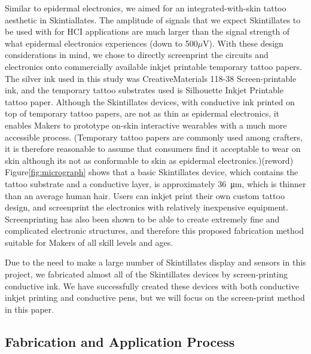 \documentclass{sigchi}
\begin{document}
Similar to epidermal electronics, we aimed for an integrated-with-skin tattoo aesthetic in Skintiallates. The amplitude of signals that we expect Skintillates to be used with for HCI applications are much larger than the signal strength of what epidermal electronics experiences (down to 500$\mu$V)\cite{Holleis:2008wn}. 
With these design considerations in mind, we chose to directly screenprint the circuits and electronics onto commercially available inkjet printable temporary tattoo papers. The silver ink used in this study was CreativeMaterials 118-38 Screen-printable ink, and the temporary tattoo substrates used is Silhouette Inkjet Printable tattoo paper. Although the  Skintillates devices, with conductive ink printed on top of temporary tattoo papers, are not as thin as epidermal electronics, it enables Makers to prototype on-skin interactive wearables with a much more accessible process. (Temporary tattoo papers are commonly used among crafters, it is therefore reasonable to assume that consumers find it acceptable to wear on skin although its not as conformable to skin as epidermal electronics.)(reword) Figure\ref{fig:micrograph} shows that a basic Skintillates device, which contains the tattoo substrate and a conductive layer, is approximately 36\SI{}{\micro\metre}, which is thinner than an average human hair. Users can inkjet print their own custom tattoo design, and screenprint the electronics with relatively inexpensive equipment. Screenprinting has also been shown to be able to create extremely fine and complicated electronic structures, and therefore this proposed fabrication method suitable for Makers of all skill levels and ages.

Due to the need to make a large number of Skintillates display and sensors in this project, we fabricated almost all of the Skintillates devices by screen-printing conductive ink. We have successfully created these devices with both conductive inkjet printing and conductive pens, but we will focus on the screen-print method in this paper. 

\subsection{Fabrication and Application Process}
\end{document}
